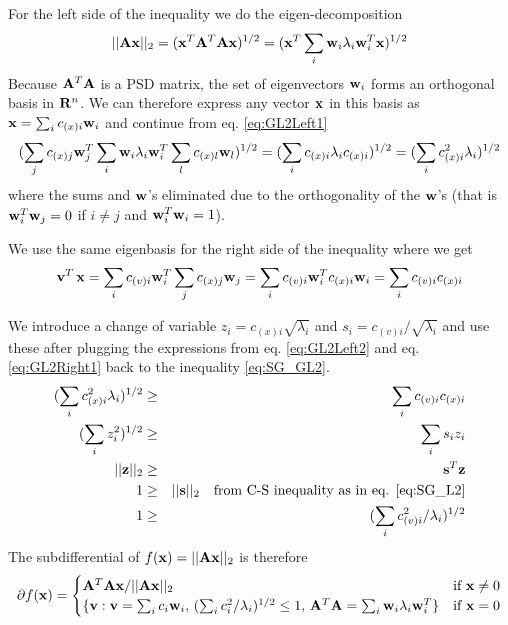 For the left side of the inequality we do the eigen-decomposition
\begin{equation}\label{eq:GL2Left1}
||\mathbf{A}\mathbf{x}||_2 = (\mathbf{x}^T \mathbf{A}^T \mathbf{A} \mathbf{x})^{1/2} 
= (\mathbf{x}^T \sum_i \mathbf{w}_i \lambda_i \mathbf{w}^T_i \mathbf{x})^{1/2}
\end{equation}
Because $\mathbf{A}^T \mathbf{A}$ is a PSD matrix, the set of eigenvectors $\mathbf{w}_i$ forms an orthogonal basis in $\mathbf{R}^n$. We can therefore express any vector $\mathbf{x}$ in this basis as $\mathbf{x} = \sum_i c_{(x)i} \mathbf{w}_i$ and continue from eq. \eqref{eq:GL2Left1}
\begin{equation}\label{eq:GL2Left2}
(\sum_j c_{(x)j} \mathbf{w}^T_j \sum_i \mathbf{w}_i \lambda_i \mathbf{w}^T_i \sum_l c_{(x)l} \mathbf{w}_l)^{1/2} 
= (\sum_i c_{(x)i} \lambda_i c_{(x)i})^{1/2} = (\sum_i c_{(x)i}^2 \lambda_i)^{1/2}
\end{equation}
where the sums and $\mathbf{w}$'s eliminated due to the orthogonality of the $\mathbf{w}$'s (that is $\mathbf{w}^T_i \mathbf{w}_j = 0$ if $i \neq j$ and $\mathbf{w}^T_i \mathbf{w}_i= 1$).

We use the same eigenbasis for the right side of the inequality where we get
\begin{equation}\label{eq:GL2Right1}
\mathbf{v}^T \, \mathbf{x} = \sum_i c_{(v)i} \mathbf{w}^T_i \sum_j c_{(x)j} \mathbf{w}_j = \sum_i c_{(v)i} \mathbf{w}^T_i c_{(x)i} \mathbf{w}_i = \sum_i c_{(v)i} c_{(x)i}
\end{equation}

We introduce a change of variable $z_i = c_{(x)i} \sqrt{\lambda_i}$ and $s_i = c_{(v)i} / \sqrt{\lambda_i}$ and use these after plugging the expressions from eq. \eqref{eq:GL2Left2} and eq. \eqref{eq:GL2Right1} back to the inequality \eqref{eq:SG_GL2}.
\begin{eqnarray}
(\sum_i c_{(x)i}^2 \lambda_i)^{1/2} & \geq & \sum_i c_{(v)i} c_{(x)i} \nonumber \\
(\sum_i z_i^2)^{1/2} & \geq & \sum_i s_i z_i \nonumber \\
||\mathbf{z}||_2 & \geq & \mathbf{s}^T \mathbf{z} \nonumber \\
1 & \geq & ||\mathbf{s}||_2 \quad \text{from C-S inequality as in eq. \eqref{eq:SG_L2}} \nonumber \\
1 & \geq & (\sum_i c_{(v)i}^2 / \lambda_i)^{1/2}
\end{eqnarray}
The subdifferential of $f(\mathbf{x}) = ||\mathbf{A}\mathbf{x}||_2$ is therefore
\begin{equation}
\partial f(\mathbf{x}) =   
\begin{cases} 
   \mathbf{A}^T \mathbf{A} \mathbf{x}/||\mathbf{A} \mathbf{x}||_2 & \text{if } \mathbf{x} \neq 0 \\
   \{\mathbf{v}: \mathbf{v} = \sum_i c_i \mathbf{w}_i, \, (\sum_i c_i^2/\lambda_i)^{1/2} \leq 1, \, \mathbf{A}^T \mathbf{A} = \sum_i \mathbf{w}_i \lambda_i \mathbf{w}_i^T \}
   & \text{if } \mathbf{x} = 0
  \end{cases}
\end{equation}

